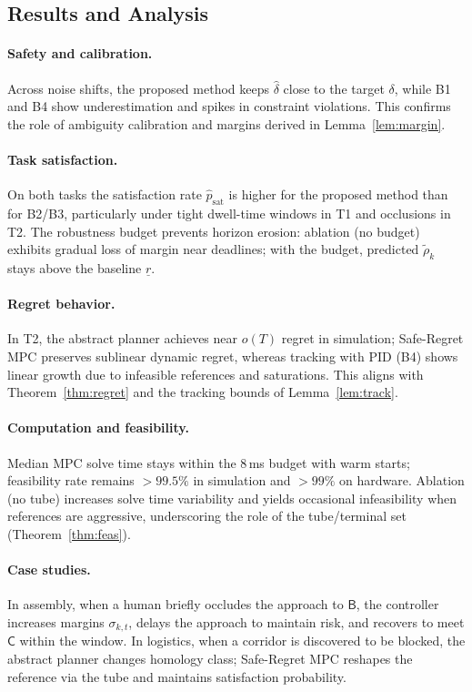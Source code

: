 \documentclass[journal]{IEEEtran}
\theoremstyle{definition}
\begin{document}
\subsection{Results and Analysis}
\paragraph*{Safety and calibration.}
Across noise shifts, the proposed method keeps $\widehat{\delta}$ close to the target $\delta$,
while B1 and B4 show underestimation and spikes in constraint violations.
This confirms the role of ambiguity calibration and margins derived in Lemma~\ref{lem:margin}.

\paragraph*{Task satisfaction.}
On both tasks the satisfaction rate $\widehat{p}_{\mathrm{sat}}$ is higher for the proposed method
than for B2/B3, particularly under tight dwell-time windows in T1 and occlusions in T2.
The robustness budget prevents horizon erosion: ablation (no budget) exhibits gradual loss of margin
near deadlines; with the budget, predicted $\widetilde{\rho}_k$ stays above the baseline $\underline r$.

\paragraph*{Regret behavior.}
In T2, the abstract planner achieves near $o(T)$ regret in simulation; Safe-Regret MPC preserves sublinear
dynamic regret, whereas tracking with PID (B4) shows linear growth due to infeasible references and saturations.
This aligns with Theorem~\ref{thm:regret} and the tracking bounds of Lemma~\ref{lem:track}.

\paragraph*{Computation and feasibility.}
Median MPC solve time stays within the 8\,ms budget with warm starts;
feasibility rate remains $>99.5\%$ in simulation and $>99\%$ on hardware.
Ablation (no tube) increases solve time variability and yields occasional infeasibility when references
are aggressive, underscoring the role of the tube/terminal set (Theorem~\ref{thm:feas}).

\paragraph*{Case studies.}
In assembly, when a human briefly occludes the approach to $\mathsf{B}$, the controller increases margins
$\sigma_{k,t}$, delays the approach to maintain risk, and recovers to meet $\mathsf{C}$ within the window.
In logistics, when a corridor is discovered to be blocked, the abstract planner changes homology class; Safe-Regret
MPC reshapes the reference via the tube and maintains satisfaction probability.
\end{document}
